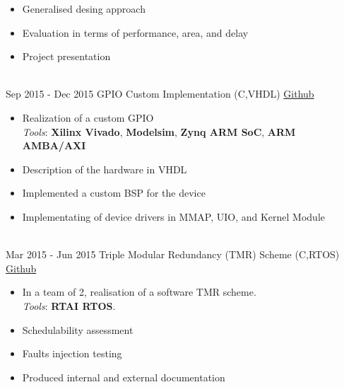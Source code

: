 \documentclass[letterpaper]{twentysecondcv} %
\begin{document}
\begin{twenty}
{\begin{itemize}
                \textit{Tools}: \textbf{Xilinx ISE}, \textbf{Modelsim}, \textbf{Timing Analyser}, \textbf{Spartan 3E FPGA}
                \item Generalised desing approach
                \item Evaluation in terms of performance, area, and delay
                \item Project presentation
		    \end{itemize}
        }\\
    \twentyitem
    	{Sep 2015 -}
		{Dec 2015}
        {GPIO Custom Implementation (C,VHDL)}
        {\href{https://github.com/artic92/gpio-zynq-7000}{Github}}
        {}
        {
            \begin{itemize}
                \item Realization of a custom GPIO\\
                \textit{Tools}: \textbf{Xilinx Vivado}, \textbf{Modelsim}, \textbf{Zynq ARM SoC}, \textbf{ARM AMBA/AXI}
                \item Description of the hardware in VHDL
                \item Implemented a custom BSP for the device
                \item Implementating of device drivers in MMAP, UIO, and Kernel Module
		    \end{itemize}
        }\\
    \twentyitem
    	{Mar 2015 -}
		{Jun 2015}
        {Triple Modular Redundancy (TMR) Scheme (C,RTOS)}
        {\href{https://github.com/artic92/tmr_rtai}{Github}}
        {}
        {
        {
            \begin{itemize}
                \item In a team of 2, realisation of a software TMR scheme. \\\textit{Tools}: \textbf{RTAI RTOS}.
                \item Schedulability assessment
                \item Faults injection testing
                \item Produced internal and external documentation
		    \end{itemize}
		}
        }
\end{twenty}

\end{document}
